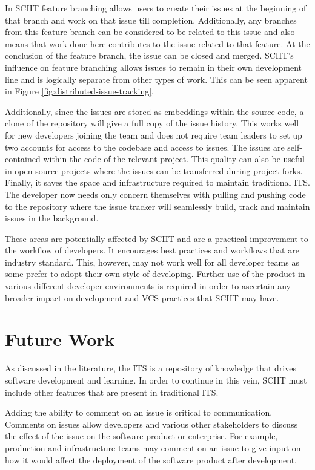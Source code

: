 \documentclass{mproj}
\begin{document}
In SCIIT feature branching allows users to create their issues at the beginning of that branch and work on that issue till completion. Additionally, any branches from this feature branch can be considered to be related to this issue and also means that work done here contributes to the issue related to that feature. At the conclusion of the feature branch, the issue can be closed and merged. SCIIT’s influence on feature branching allows issues to remain in their own development line and is logically separate from other types of work. This can be seen apparent in Figure \ref{fig:distributed-issue-tracking}.


Additionally, since the issues are stored as embeddings within the source code, a clone of the repository will give a full copy of the issue history. This works well for new developers joining the team and does not require team leaders to set up two accounts for access to the codebase and access to issues. The issues are self-contained within the code of the relevant project. This quality can also be useful in open source projects where the issues can be transferred during project forks. Finally, it saves the space and infrastructure required to maintain traditional ITS. The developer now needs only concern themselves with pulling and pushing code to the repository where the issue tracker will seamlessly build, track and maintain issues in the background.

These areas are potentially affected by SCIIT and are a practical improvement to the workflow of developers. It encourages best practices and workflows that are industry standard. This, however, may not work well for all developer teams as some prefer to adopt their own style of developing. Further use of the product in various different developer environments is required in order to ascertain any broader impact on development and VCS practices that SCIIT may have.


\section{Future Work}

As discussed in the literature, the ITS is a repository of knowledge that drives software development and learning. In order to continue in this vein, SCIIT must include other features that are present in traditional ITS.

Adding the ability to comment on an issue is critical to communication. Comments on issues allow developers and various other stakeholders to discuss the effect of the issue on the software product or enterprise. For example, production and infrastructure teams may comment on an issue to give input on how it would affect the deployment of the software product after development.
\end{document}

